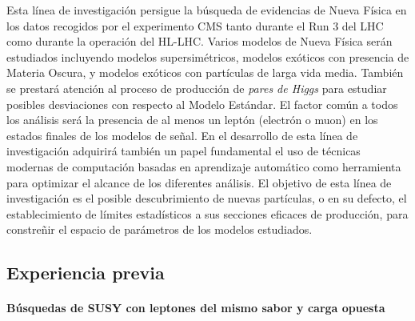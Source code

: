 Esta línea de investigación persigue la búsqueda de evidencias de Nueva Física en los datos recogidos por el experimento CMS tanto durante el Run 3 del LHC como durante la operación del HL-LHC. Varios modelos de Nueva Física serán estudiados incluyendo modelos supersimétricos, modelos exóticos con presencia de Materia Oscura, y modelos exóticos con partículas de larga vida media. También se prestará atención al proceso de producción de \emph{pares de Higgs} para estudiar posibles desviaciones con respecto al Modelo Estándar. El factor común a todos los análisis será la presencia de al menos un leptón (electrón o muon) en los estados finales de los modelos de señal. En el desarrollo de esta línea de investigación adquirirá también un papel fundamental el uso de técnicas modernas de computación basadas en aprendizaje automático como herramienta para optimizar el alcance de los diferentes análisis. El objetivo de esta línea de investigación es el posible descubrimiento de nuevas partículas, o en su defecto, el establecimiento de límites estadísticos a sus secciones eficaces de producción, para constreñir el espacio de parámetros de los modelos estudiados.

\subsection{Experiencia previa}

\paragraph{Búsquedas de SUSY con leptones del mismo sabor y carga opuesta\\\\}

